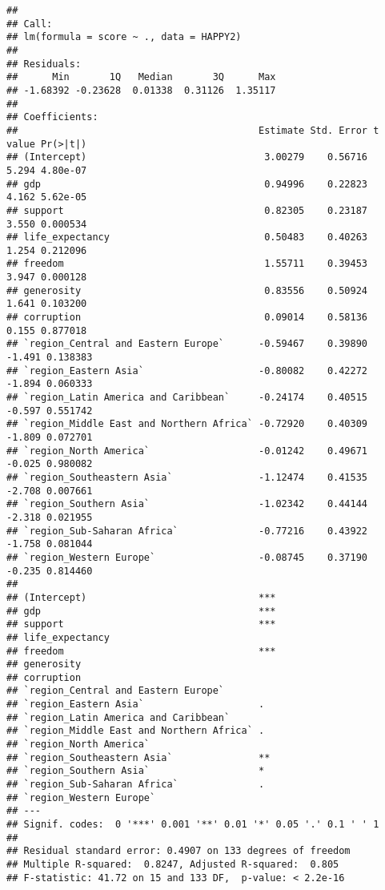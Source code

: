 \documentclass[
]{article}
\begin{document}
\begin{verbatim}
## 
## Call:
## lm(formula = score ~ ., data = HAPPY2)
## 
## Residuals:
##      Min       1Q   Median       3Q      Max 
## -1.68392 -0.23628  0.01338  0.31126  1.35117 
## 
## Coefficients:
##                                          Estimate Std. Error t value Pr(>|t|)
## (Intercept)                               3.00279    0.56716   5.294 4.80e-07
## gdp                                       0.94996    0.22823   4.162 5.62e-05
## support                                   0.82305    0.23187   3.550 0.000534
## life_expectancy                           0.50483    0.40263   1.254 0.212096
## freedom                                   1.55711    0.39453   3.947 0.000128
## generosity                                0.83556    0.50924   1.641 0.103200
## corruption                                0.09014    0.58136   0.155 0.877018
## `region_Central and Eastern Europe`      -0.59467    0.39890  -1.491 0.138383
## `region_Eastern Asia`                    -0.80082    0.42272  -1.894 0.060333
## `region_Latin America and Caribbean`     -0.24174    0.40515  -0.597 0.551742
## `region_Middle East and Northern Africa` -0.72920    0.40309  -1.809 0.072701
## `region_North America`                   -0.01242    0.49671  -0.025 0.980082
## `region_Southeastern Asia`               -1.12474    0.41535  -2.708 0.007661
## `region_Southern Asia`                   -1.02342    0.44144  -2.318 0.021955
## `region_Sub-Saharan Africa`              -0.77216    0.43922  -1.758 0.081044
## `region_Western Europe`                  -0.08745    0.37190  -0.235 0.814460
##                                             
## (Intercept)                              ***
## gdp                                      ***
## support                                  ***
## life_expectancy                             
## freedom                                  ***
## generosity                                  
## corruption                                  
## `region_Central and Eastern Europe`         
## `region_Eastern Asia`                    .  
## `region_Latin America and Caribbean`        
## `region_Middle East and Northern Africa` .  
## `region_North America`                      
## `region_Southeastern Asia`               ** 
## `region_Southern Asia`                   *  
## `region_Sub-Saharan Africa`              .  
## `region_Western Europe`                     
## ---
## Signif. codes:  0 '***' 0.001 '**' 0.01 '*' 0.05 '.' 0.1 ' ' 1
## 
## Residual standard error: 0.4907 on 133 degrees of freedom
## Multiple R-squared:  0.8247, Adjusted R-squared:  0.805 
## F-statistic: 41.72 on 15 and 133 DF,  p-value: < 2.2e-16
\end{verbatim}
\end{document}
